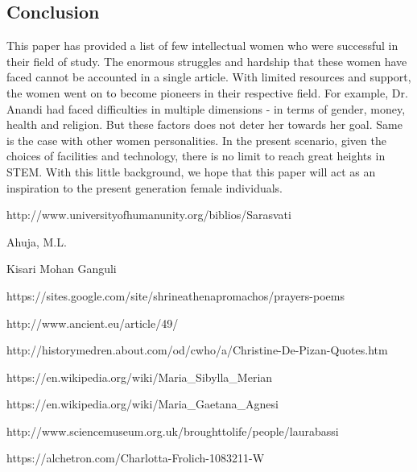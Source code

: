 \documentclass[a4paper,10pt]{article}
\begin{document}
\begin{center}
\section{Conclusion}
\label{sec:conclusion}
This paper has provided a list of few intellectual women who were successful in their field of study. The enormous struggles and hardship that these women have faced cannot be accounted in a single article. With limited resources and support, the women went on to become pioneers in their respective field. For example, Dr. Anandi had faced difficulties in multiple dimensions - in terms of gender, money, health and religion. But these factors does not deter her towards her goal. Same is the case with other women personalities. In the present scenario, given the choices of facilities and technology, there is no limit to reach great heights in STEM. With this little background, we hope that this paper will act as an inspiration to the present generation female individuals.
\begin{thebibliography}{9}

http://www.universityofhumanunity.org/biblios/Sarasvati%

Ahuja, M.L. 

 Kisari Mohan Ganguli

https://sites.google.com/site/shrineathenapromachos/prayers-poems

http://www.ancient.eu/article/49/

http://historymedren.about.com/od/cwho/a/Christine-De-Pizan-Quotes.htm

https://en.wikipedia.org/wiki/Maria\_Sibylla\_Merian

https://en.wikipedia.org/wiki/Maria\_Gaetana\_Agnesi

http://www.sciencemuseum.org.uk/broughttolife/people/laurabassi

https://alchetron.com/Charlotta-Frolich-1083211-W




\end{thebibliography}
\end{center}
\end{document}
